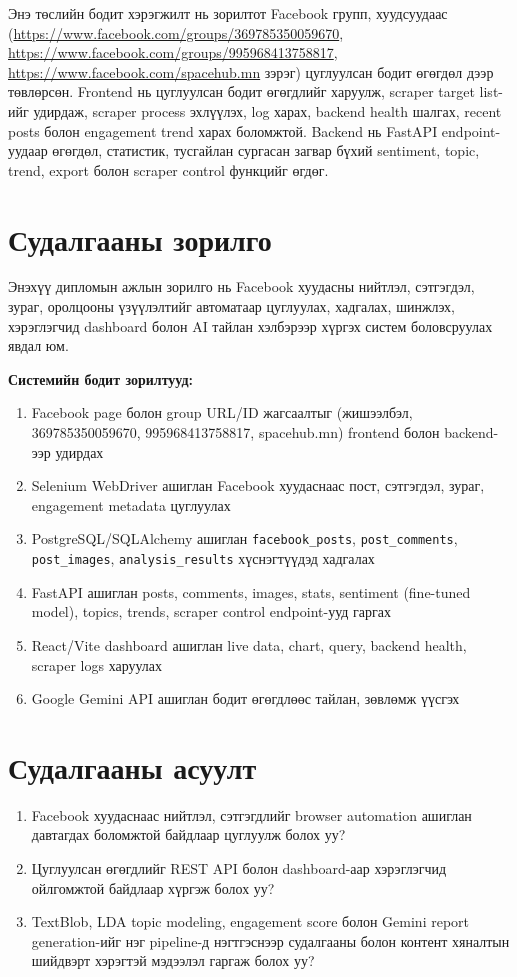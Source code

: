 \documentclass[
12pt,
oneside,
english,
onehalfspacing,
nolistspacing,
headsepline,
]{MUST-Thesis}
\begin{document}
Энэ төслийн бодит хэрэгжилт нь зорилтот Facebook групп, хуудсуудаас (\url{https://www.facebook.com/groups/369785350059670}, \url{https://www.facebook.com/groups/995968413758817}, \url{https://www.facebook.com/spacehub.mn} зэрэг) цуглуулсан бодит өгөгдөл дээр төвлөрсөн. Frontend нь цуглуулсан бодит өгөгдлийг харуулж, scraper target list-ийг удирдаж, scraper process эхлүүлэх, log харах, backend health шалгах, recent posts болон engagement trend харах боломжтой. Backend нь FastAPI endpoint-уудаар өгөгдөл, статистик, тусгайлан сургасан загвар бүхий sentiment, topic, trend, export болон scraper control функцийг өгдөг.

\section{Судалгааны зорилго}

Энэхүү дипломын ажлын зорилго нь Facebook хуудасны нийтлэл, сэтгэгдэл, зураг, оролцооны үзүүлэлтийг автоматаар цуглуулах, хадгалах, шинжлэх, хэрэглэгчид dashboard болон AI тайлан хэлбэрээр хүргэх систем боловсруулах явдал юм.

\textbf{Системийн бодит зорилтууд:}
\begin{enumerate}
    \item Facebook page болон group URL/ID жагсаалтыг (жишээлбэл, 369785350059670, 995968413758817, spacehub.mn) frontend болон backend-ээр удирдах
    \item Selenium WebDriver ашиглан Facebook хуудаснаас пост, сэтгэгдэл, зураг, engagement metadata цуглуулах
    \item PostgreSQL/SQLAlchemy ашиглан \texttt{facebook\_posts}, \texttt{post\_comments}, \texttt{post\_images}, \texttt{analysis\_results} хүснэгтүүдэд хадгалах
    \item FastAPI ашиглан posts, comments, images, stats, sentiment (fine-tuned model), topics, trends, scraper control endpoint-ууд гаргах
    \item React/Vite dashboard ашиглан live data, chart, query, backend health, scraper logs харуулах
    \item Google Gemini API ашиглан бодит өгөгдлөөс тайлан, зөвлөмж үүсгэх
\end{enumerate}

\section{Судалгааны асуулт}

\begin{enumerate}
    \item Facebook хуудаснаас нийтлэл, сэтгэгдлийг browser automation ашиглан давтагдах боломжтой байдлаар цуглуулж болох уу?
    \item Цуглуулсан өгөгдлийг REST API болон dashboard-аар хэрэглэгчид ойлгомжтой байдлаар хүргэж болох уу?
    \item TextBlob, LDA topic modeling, engagement score болон Gemini report generation-ийг нэг pipeline-д нэгтгэснээр судалгааны болон контент хяналтын шийдвэрт хэрэгтэй мэдээлэл гаргаж болох уу?
\end{enumerate}
\end{document}
